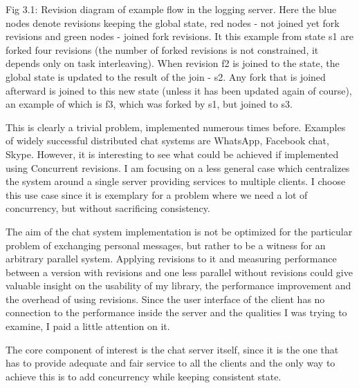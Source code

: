 \documentclass[12pt,twoside,notitlepage]{report}
\begin{document}
{

Fig 3.1: Revision diagram of example flow in the logging server. Here the blue nodes denote revisions keeping the global state, red nodes - not joined yet fork revisions and green nodes - joined fork revisions. It this example from state s1 are forked four revisions (the number of forked revisions is not constrained, it depends only on task interleaving). When revision f2 is joined to the state, the global state is updated to the result of the join - s2. Any fork that is joined afterward is joined to this new state (unless it has been updated again of course), an example of which is f3, which was forked by s1, but joined to s3. 
      
\vspace{15pt}
This is clearly a trivial problem, implemented numerous times before. Examples of widely successful distributed chat systems are WhatsApp, Facebook chat, Skype. However, it is interesting to see what could be achieved if implemented using Concurrent revisions. I am focusing on a less general case which centralizes the system around a single server providing services to multiple clients. I choose this use case since it is exemplary for a problem where we need a lot of concurrency, but without sacrificing consistency. 

The aim of the chat system implementation is not be optimized for the particular problem of exchanging personal messages, but rather to be a witness for an arbitrary parallel system. Applying revisions to it and measuring performance between a version with revisions and one less parallel without revisions could give valuable insight on the usability of my library, the performance improvement and the overhead of using revisions. Since the user interface of the client has no connection to the performance inside the server and the qualities I was trying to examine, I paid a little attention on it.   

The core component of interest is the chat server itself, since it is the one that has to provide adequate and fair service to all the clients and the only way to achieve this is to add concurrency while keeping consistent state.

}
\end{document}
